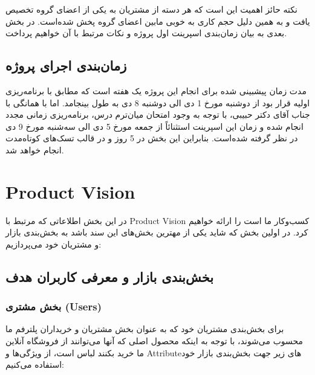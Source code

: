 \documentclass[]{article}
\begin{document}
نکته حائز اهمیت این است که هر دسته از مشتریان به یکی از اعضای گروه تخصیص
یافت و به همین دلیل حجم کاری به خوبی مابین اعضای گروه پخش شده‌است. در
بخش بعدی به بیان زمان‌بندی اسپرینت اول پروژه و نکات مرتبط با آن خواهیم
پرداخت.

\subsection{زمان‌بندی اجرای
پروژه}\label{ux632ux645ux627ux646ux628ux646ux62fux6cc-ux627ux62cux631ux627ux6cc-ux67eux631ux648ux698ux647}

مدت زمان پیشبینی شده برای انجام این پروژه یک هفته است که مطابق با
برنامه‌ریزی اولیه قرار بود از دوشنبه مورخ 1 دی الی دوشنبه 8 دی به طول
بینجامد. اما با همانگی با جناب آقای دکتر حبیبی، با توجه به وجود امتحان
میان‌ترم درس، برنامه‌ریزی زمانی مجدد انجام شده و زمان این اسپرینت
استثنائاً از جمعه مورخ 5 دی الی سه‌شنبه مورخ 9 دی در نظر گرفته شده‌است.
بنابراین این بخش در 5 روز و در قالب تسک‌های کوتاه‌مدت انجام خواهد شد.

\section{Product Vision}\label{product-vision}

در این بخش اطلاعاتی که مرتبط با Product Vision کسب‌وکار ما است را ارائه
خواهیم کرد. در اولین بخش که شاید یکی از مهترین بخش‌های این سند باشد به
بخش‌بندی بازار و مشتریان خود می‌پردازیم:

\subsection{بخش‌بندی بازار و معرفی کاربران
هدف}\label{ux628ux62eux634ux628ux646ux62fux6cc-ux628ux627ux632ux627ux631-ux648-ux645ux639ux631ux641ux6cc-ux6a9ux627ux631ux628ux631ux627ux646-ux647ux62fux641}

\subsubsection{بخش مشتری
(Users)}\label{ux628ux62eux634-ux645ux634ux62aux631ux6cc-users}

برای بخش‌بندی مشتریان خود که به عنوان بخش مشتریان و خریداران پلترفم ما
محسوب می‌شوند، با توجه به اینکه محصول اصلی که آنها می‌توانند از فروشگاه
آنلاین ما خرید بکنند لباس است، از ویژگی‌ها و Attributeهای زیر جهت
بخش‌بندی بازار خود استفاده می‌کنیم:
\end{document}
